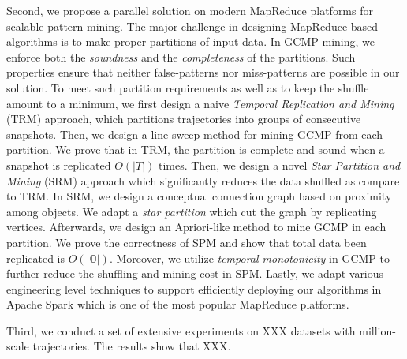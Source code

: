 Second, we propose a parallel solution on modern MapReduce platforms for scalable pattern mining.
The major challenge in designing MapReduce-based algorithms is to make proper partitions of input data.
In GCMP mining, we enforce both the \emph{soundness} and the \emph{completeness} 
of the partitions. Such properties ensure that neither false-patterns 
nor miss-patterns are possible in our solution. To meet such partition requirements
as well as to keep the shuffle amount to a minimum,
% 
%
we first design a naive \emph{Temporal Replication and Mining} (TRM)
approach, which partitions trajectories into groups of consecutive snapshots. Then, we design a line-sweep
method for mining GCMP from each partition. We prove that in TRM, the partition is complete and sound when a snapshot is replicated $O(|T|)$ times. 
Then, we design a novel \emph{Star Partition and Mining} (SRM) approach which significantly reduces the data shuffled
as compare to TRM. In SRM, we design a conceptual connection graph based on proximity among objects. We adapt
a \emph{star partition} which cut the graph by replicating vertices. Afterwards, we design an Apriori-like method to mine
GCMP in each partition. We prove the correctness of SPM and show that total data been replicated is $O(|\mathbb{O}|)$.
Moreover, we utilize \emph{temporal monotonicity} in GCMP to further reduce the shuffling and mining cost in SPM. Lastly, we adapt various engineering level techniques to support efficiently deploying our algorithms in 
Apache Spark which is one of the most popular MapReduce platforms.


Third, we conduct a set of extensive experiments on XXX datasets with million-scale trajectories. The results show that XXX.

